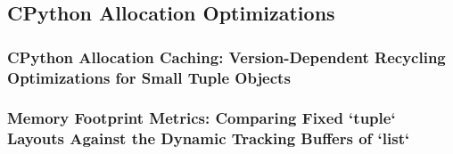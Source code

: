 \subsection{CPython Allocation Optimizations}
\subsubsection{CPython Allocation Caching: Version-Dependent Recycling Optimizations for Small Tuple Objects}
\subsubsection{Memory Footprint Metrics: Comparing Fixed `tuple` Layouts Against the Dynamic Tracking Buffers of `list`}
